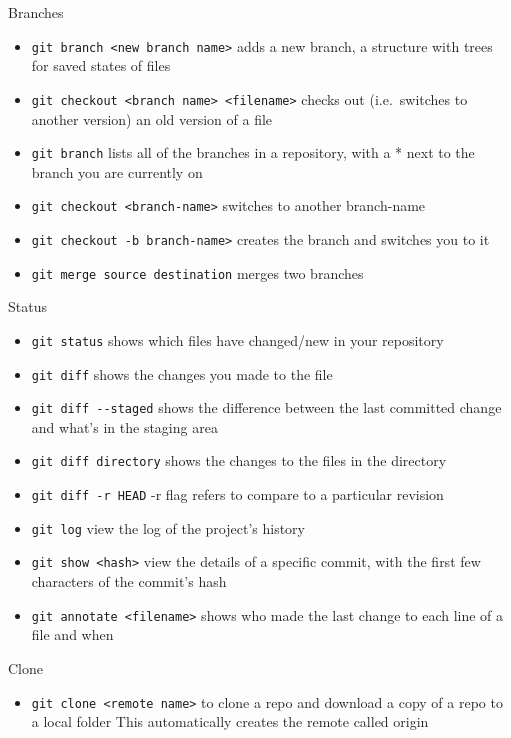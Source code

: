 \documentclass[
  12pt,
]{book}
\providecommand{\tightlist}{%
  \setlength{\itemsep}{0pt}\setlength{\parskip}{0pt}}
\begin{document}
Branches

\begin{itemize}
\tightlist
\item
  \texttt{git\ branch\ \textless{}new\ branch\ name\textgreater{}} adds a new branch, a structure with trees for saved states of files
\item
  \texttt{git\ checkout\ \textless{}branch\ name\textgreater{}\ \textless{}filename\textgreater{}} checks out (i.e.~switches to another version) an old version of a file
\item
  \texttt{git\ branch} lists all of the branches in a repository, with a * next to the branch you are currently on
\item
  \texttt{git\ checkout\ \textless{}branch-name\textgreater{}} switches to another branch-name
\item
  \texttt{git\ checkout\ -b\ branch-name\textgreater{}} creates the branch and switches you to it
\item
  \texttt{git\ merge\ source\ destination} merges two branches
\end{itemize}

Status

\begin{itemize}
\tightlist
\item
  \texttt{git\ status} shows which files have changed/new in your repository
\item
  \texttt{git\ diff} shows the changes you made to the file
\item
  \texttt{git\ diff\ -\/-staged} shows the difference between the last committed change and what's in the staging area
\item
  \texttt{git\ diff\ directory} shows the changes to the files in the directory
\item
  \texttt{git\ diff\ -r\ HEAD} -r flag refers to compare to a particular revision
\item
  \texttt{git\ log} view the log of the project's history
\item
  \texttt{git\ show\ \textless{}hash\textgreater{}} view the details of a specific commit, with the first few characters of the commit's hash
\item
  \texttt{git\ annotate\ \textless{}filename\textgreater{}} shows who made the last change to each line of a file and when
\end{itemize}

Clone

\begin{itemize}
\tightlist
\item
  \texttt{git\ clone\ \textless{}remote\ name\textgreater{}} to clone a repo and download a copy of a repo to a local folder This automatically creates the remote called origin
\end{itemize}
\end{document}
